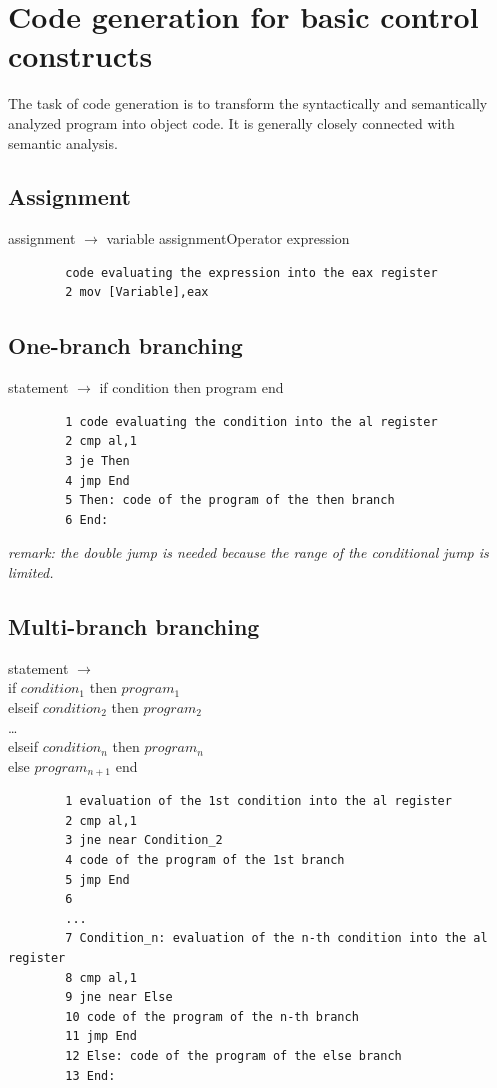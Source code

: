 \documentclass[margin=0px]{article}
\begin{document}
\section{Code generation for basic control constructs}


The task of code generation is to transform the syntactically and semantically analyzed program into object code. It is generally closely connected with
semantic analysis.

\subsection{Assignment}

assignment $ \rightarrow $ variable assignmentOperator expression

\begin{verbatim}
		code evaluating the expression into the eax register
		2 mov [Variable],eax
	\end{verbatim}

\subsection{One-branch branching}
statement $ \rightarrow $ if condition then program end

\begin{verbatim}
		1 code evaluating the condition into the al register
		2 cmp al,1
		3 je Then
		4 jmp End
		5 Then: code of the program of the then branch
		6 End:
	\end{verbatim}

\textit{remark: the double jump is needed because the range of the conditional jump is limited.}

\subsection{Multi-branch branching}


statement $ \rightarrow $
\\if $ condition_1 $ then $ program_1 $
\\elseif $ condition_2 $ then $ program_2 $
\\\dots
\\elseif $ condition_n $ then $ program_n $
\\else $ program_{n+1} $ end

\begin{verbatim}
		1 evaluation of the 1st condition into the al register
		2 cmp al,1
		3 jne near Condition_2
		4 code of the program of the 1st branch
		5 jmp End
		6
		...
		7 Condition_n: evaluation of the n-th condition into the al register
		8 cmp al,1
		9 jne near Else
		10 code of the program of the n-th branch
		11 jmp End
		12 Else: code of the program of the else branch
		13 End:
	\end{verbatim}
\end{document}
